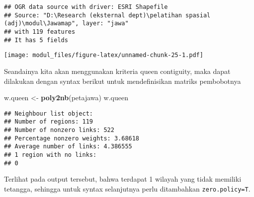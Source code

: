 \documentclass[
]{book}
\newenvironment{Shaded}{\begin{snugshade}}{\end{snugshade}}
\newcommand{\DataTypeTok}[1]{\textcolor[rgb]{0.13,0.29,0.53}{#1}}
\newcommand{\DecValTok}[1]{\textcolor[rgb]{0.00,0.00,0.81}{#1}}
\newcommand{\KeywordTok}[1]{\textcolor[rgb]{0.13,0.29,0.53}{\textbf{#1}}}
\newcommand{\NormalTok}[1]{#1}
\newcommand{\OperatorTok}[1]{\textcolor[rgb]{0.81,0.36,0.00}{\textbf{#1}}}
\newcommand{\StringTok}[1]{\textcolor[rgb]{0.31,0.60,0.02}{#1}}
\begin{document}
\begin{verbatim}
## OGR data source with driver: ESRI Shapefile 
## Source: "D:\Research (eksternal dept)\pelatihan spasial (adj)\modul\Jawamap", layer: "jawa"
## with 119 features
## It has 5 fields
\end{verbatim}

\begin{Shaded}
\end{Shaded}

\texttt{[image: modul\_files/figure-latex/unnamed-chunk-25-1.pdf]}

Seandainya kita akan menggunakan kriteria queen contiguity, maka dapat dilakukan dengan syntax berikut untuk mendefinisikan matriks pembobotnya

\begin{Shaded}
\begin{Highlighting}[]
\NormalTok{w.queen \textless{}{-}}\StringTok{ }\KeywordTok{poly2nb}\NormalTok{(petajawa)}
\NormalTok{w.queen}
\end{Highlighting}
\end{Shaded}

\begin{verbatim}
## Neighbour list object:
## Number of regions: 119 
## Number of nonzero links: 522 
## Percentage nonzero weights: 3.68618 
## Average number of links: 4.386555 
## 1 region with no links:
## 0
\end{verbatim}

Terlihat pada output tersebut, bahwa terdapat 1 wilayah yang tidak memiliki tetangga, sehingga untuk syntax selanjutnya perlu ditambahkan \texttt{zero.policy=T}.
\end{document}
